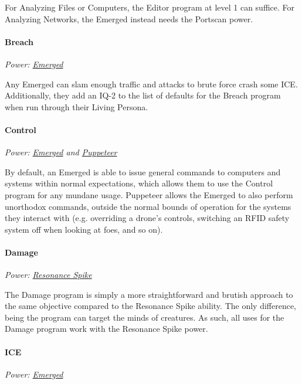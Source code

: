 \begin{multicols*}{3}
	For Analyzing Files or Computers, the Editor program at level 1 can suffice. For Analyzing Networks, the Emerged instead needs the Portscan power.

	\paragraph{Breach}
	\begin{center}
		\textit{Power: \hyperref[emerged]{Emerged}}
	\end{center}

	Any Emerged can slam enough traffic and attacks to brute force crash some ICE. Additionally, they add an IQ-2 to the list of defaults for the Breach program when run through their Living Persona.
	
	\paragraph{Control}
	\begin{center}
		\textit{Power: \hyperref[emerged]{Emerged} and \hyperref[puppeteer]{Puppeteer}}
	\end{center}

	By default, an Emerged is able to issue general commands to computers and systems within normal expectations, which allows them to use the Control program for any mundane usage. Puppeteer allows the Emerged to also perform unorthodox commands, outside the normal bounds of operation for the systems they interact with (e.g. overriding a drone's controls, switching an RFID safety system off when looking at foes, and so on).
	
	\paragraph{Damage}
	\begin{center}
		\textit{Power: \hyperref[resonance_spike]{Resonance Spike}}
	\end{center}

	The Damage program is simply a more straightforward and brutish approach to the same objective compared to the Resonance Spike ability. The only difference, being the program can target the minds of creatures. As such, all uses for the Damage program work with the Resonance Spike power.
	
	\paragraph{ICE}
	\begin{center}
		\textit{Power: \hyperref[emerged]{Emerged}}
	\end{center}


\end{multicols*}
